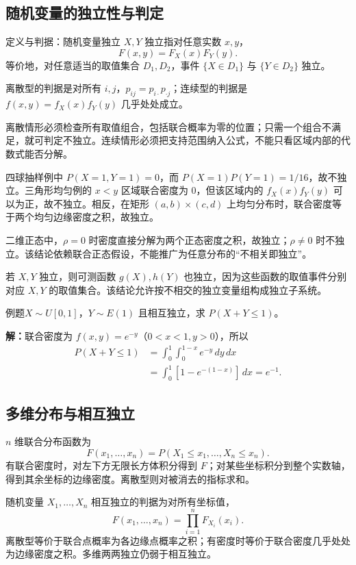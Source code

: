 \documentclass[UTF8,fontset=none,zihao=-4,a4paper]{ctexart}
\newcommand{\example}[1]{\begin{infobox}{例题}#1\end{infobox}}
\newcommand{\solution}{\par\noindent\textbf{解：}}
\begin{document}
\subsection{随机变量的独立性与判定}
\begin{infobox}{定义与判据：随机变量独立}
$X,Y$ 独立指对任意实数 $x,y$，
\[
F(x,y)=F_X(x)F_Y(y).
\]
等价地，对任意适当的取值集合 $D_1,D_2$，事件 $\{X\in D_1\}$ 与 $\{Y\in D_2\}$ 独立。

离散型的判据是对所有 $i,j$，$p_{ij}=p_{i\cdot}p_{\cdot j}$；连续型的判据是 $f(x,y)=f_X(x)f_Y(y)$ 几乎处处成立。
\end{infobox}
离散情形必须检查所有取值组合，包括联合概率为零的位置；只需一个组合不满足，就可判定不独立。连续情形必须把支持范围纳入公式，不能只看区域内部的代数式能否分解。

四球抽样例中 $P(X=1,Y=1)=0$，而 $P(X=1)P(Y=1)=1/16$，故不独立。三角形均匀例的 $x<y$ 区域联合密度为 $0$，但该区域内的 $f_X(x)f_Y(y)$ 可以为正，故不独立。相反，在矩形 $(a,b)\times(c,d)$ 上均匀分布时，联合密度等于两个均匀边缘密度之积，故独立。

二维正态中，$\rho=0$ 时密度直接分解为两个正态密度之积，故独立；$\rho\ne0$ 时不独立。该结论依赖联合正态假设，不能推广为任意分布的“不相关即独立”。

若 $X,Y$ 独立，则可测函数 $g(X),h(Y)$ 也独立，因为这些函数的取值事件分别对应 $X,Y$ 的取值集合。该结论允许按不相交的独立变量组构成独立子系统。
\example{$X\sim U[0,1]$，$Y\sim E(1)$ 且相互独立，求 $P(X+Y\le1)$。}
\solution 联合密度为 $f(x,y)=e^{-y}$（$0<x<1,y>0$），所以
\begin{align*}
P(X+Y\le1)&=\int_0^1\int_0^{1-x}e^{-y}\,dy\,dx\\
&=\int_0^1[1-e^{-(1-x)}]\,dx=e^{-1}.
\end{align*}
\subsection{多维分布与相互独立}
$n$ 维联合分布函数为
\[
F(x_1,\ldots,x_n)=P(X_1\le x_1,\ldots,X_n\le x_n).
\]
有联合密度时，对左下方无限长方体积分得到 $F$；对某些坐标积分到整个实数轴，得到其余坐标的边缘密度。离散型则对被消去的指标求和。

随机变量 $X_1,\ldots,X_n$ 相互独立的判据为对所有坐标值，
\[
F(x_1,\ldots,x_n)=\prod_{i=1}^n F_{X_i}(x_i).
\]
离散型等价于联合点概率为各边缘点概率之积；有密度时等价于联合密度几乎处处为边缘密度之积。多维两两独立仍弱于相互独立。
\end{document}
